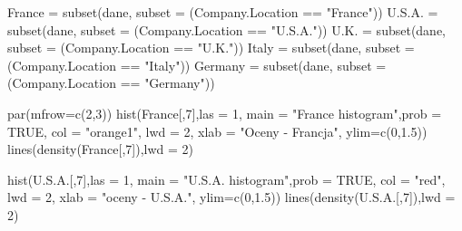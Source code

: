 \documentclass[
]{article}
\newenvironment{Shaded}{\begin{snugshade}}{\end{snugshade}}
\newcommand{\AttributeTok}[1]{\textcolor[rgb]{0.77,0.63,0.00}{#1}}
\newcommand{\ConstantTok}[1]{\textcolor[rgb]{0.00,0.00,0.00}{#1}}
\newcommand{\DecValTok}[1]{\textcolor[rgb]{0.00,0.00,0.81}{#1}}
\newcommand{\FloatTok}[1]{\textcolor[rgb]{0.00,0.00,0.81}{#1}}
\newcommand{\FunctionTok}[1]{\textcolor[rgb]{0.00,0.00,0.00}{#1}}
\newcommand{\NormalTok}[1]{#1}
\newcommand{\OtherTok}[1]{\textcolor[rgb]{0.56,0.35,0.01}{#1}}
\newcommand{\SpecialCharTok}[1]{\textcolor[rgb]{0.00,0.00,0.00}{#1}}
\newcommand{\StringTok}[1]{\textcolor[rgb]{0.31,0.60,0.02}{#1}}
\begin{document}
\begin{Shaded}
\begin{Highlighting}[]
\NormalTok{France }\OtherTok{=} \FunctionTok{subset}\NormalTok{(dane, }\AttributeTok{subset =}\NormalTok{ (Company.Location }\SpecialCharTok{==} \StringTok{"France"}\NormalTok{))}
\NormalTok{U.S.A. }\OtherTok{=} \FunctionTok{subset}\NormalTok{(dane, }\AttributeTok{subset =}\NormalTok{ (Company.Location }\SpecialCharTok{==} \StringTok{"U.S.A."}\NormalTok{))}
\NormalTok{U.K. }\OtherTok{=} \FunctionTok{subset}\NormalTok{(dane, }\AttributeTok{subset =}\NormalTok{ (Company.Location }\SpecialCharTok{==} \StringTok{"U.K."}\NormalTok{))}
\NormalTok{Italy }\OtherTok{=} \FunctionTok{subset}\NormalTok{(dane, }\AttributeTok{subset =}\NormalTok{ (Company.Location }\SpecialCharTok{==} \StringTok{"Italy"}\NormalTok{))}
\NormalTok{Germany }\OtherTok{=} \FunctionTok{subset}\NormalTok{(dane, }\AttributeTok{subset =}\NormalTok{ (Company.Location }\SpecialCharTok{==} \StringTok{"Germany"}\NormalTok{))}

\FunctionTok{par}\NormalTok{(}\AttributeTok{mfrow=}\FunctionTok{c}\NormalTok{(}\DecValTok{2}\NormalTok{,}\DecValTok{3}\NormalTok{))}
\FunctionTok{hist}\NormalTok{(France[,}\DecValTok{7}\NormalTok{],}\AttributeTok{las =} \DecValTok{1}\NormalTok{, }\AttributeTok{main =} \StringTok{"France histogram"}\NormalTok{,}\AttributeTok{prob =} \ConstantTok{TRUE}\NormalTok{,}
                      \AttributeTok{col =} \StringTok{"orange1"}\NormalTok{,}
                      \AttributeTok{lwd =} \DecValTok{2}\NormalTok{,}
                      \AttributeTok{xlab =} \StringTok{"Oceny {-} Francja"}\NormalTok{,}
                      \AttributeTok{ylim=}\FunctionTok{c}\NormalTok{(}\DecValTok{0}\NormalTok{,}\FloatTok{1.5}\NormalTok{))}
\FunctionTok{lines}\NormalTok{(}\FunctionTok{density}\NormalTok{(France[,}\DecValTok{7}\NormalTok{]),}\AttributeTok{lwd =} \DecValTok{2}\NormalTok{)}

\FunctionTok{hist}\NormalTok{(U.S.A.[,}\DecValTok{7}\NormalTok{],}\AttributeTok{las =} \DecValTok{1}\NormalTok{, }\AttributeTok{main =} \StringTok{"U.S.A. histogram"}\NormalTok{,}\AttributeTok{prob =} \ConstantTok{TRUE}\NormalTok{,}
                      \AttributeTok{col =} \StringTok{"red"}\NormalTok{,}
                      \AttributeTok{lwd =} \DecValTok{2}\NormalTok{,}
                      \AttributeTok{xlab =} \StringTok{"oceny {-} U.S.A."}\NormalTok{,}
                      \AttributeTok{ylim=}\FunctionTok{c}\NormalTok{(}\DecValTok{0}\NormalTok{,}\FloatTok{1.5}\NormalTok{))}
\FunctionTok{lines}\NormalTok{(}\FunctionTok{density}\NormalTok{(U.S.A.[,}\DecValTok{7}\NormalTok{]),}\AttributeTok{lwd =} \DecValTok{2}\NormalTok{)}


\end{Highlighting}
\end{Shaded}
\end{document}
